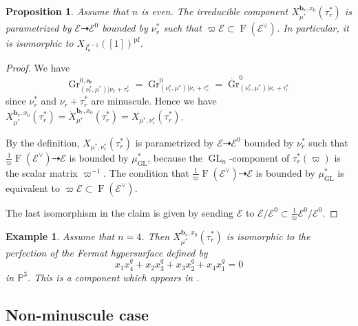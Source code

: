 \documentclass[12pt,a4paper]{article}
\newtheorem{prop}[thm]{Proposition}
\newtheorem{eg}[thm]{Example}
\DeclareMathOperator{\Gr}{Gr}
\DeclareMathOperator{\GL}{GL}
\DeclareMathOperator{\oF}{F}
\newcommand{\bP}{\mathbb{P}}
\newcommand{\bfa}{\mathbf{a}}
\newcommand{\bfb}{\mathbf{b}}
\newcommand{\cE}{\mathcal{E}}
\begin{document}
\begin{prop}\label{prop:nur}
Assume that $n$ is even. The irreducible component 
$X_{\mu^*}^{\bfb_r,x_0}(\tau_r^*)$ is 
parametrized by 
$\cE \dashrightarrow \cE^0$ bounded by 
$\nu_r^*$ such that 
$\varpi \cE \subset \oF (\cE^{\vee})$. 
In particular, it is isomorphic to 
$X_{I_{n}^{r-1}}([1])^{\mathrm{pf}}$. 
\end{prop}
\begin{proof}
We have 
\[
 \Gr^{0,\bfa_r}_{(\nu^*_r, \mu^*) | \nu_r+\tau^*_r }
 =\Gr^{0}_{(\nu^*_r, \mu^*) | \nu_r+\tau^*_r }
 =\mathring{\Gr}^{0}_{(\nu^*_r, \mu^*) | \nu_r+\tau^*_r } 
\] 
since $\nu_r^*$ and $\nu_r+\tau^*_r$ are minuscule. Hence we have 
$X_{\mu^*}^{\bfb_r,x_0}(\tau_r^*)=\mathring{X}_{\mu^*}^{\bfb_r,x_0}(\tau_r^*)=X_{\mu^*,\nu_r^*}(\tau_r^*)$. 

By the definition, 
$X_{\mu^*,\nu_r^*}(\tau_r^*)$ 
is parametrized by 
$\cE \dashrightarrow \cE^0$ bounded by 
$\nu_r^*$ such that 
$\frac{1}{\varpi} \oF (\cE^{\vee}) \dashrightarrow \cE$ 
is bounded by $\mu_{\GL}^*$, because the $\GL_n$-component of $\tau_r^*(\varpi)$ is the scalar matrix $\varpi^{-1}$. 
The condition that 
$\frac{1}{\varpi} \oF (\cE^{\vee}) \dashrightarrow \cE$ 
is bounded by $\mu_{\GL}^*$ is equivalent to 
$\varpi \cE \subset \oF (\cE^{\vee})$. 

The last isomorphism in the claim 
is given by sending 
$\cE$ to 
$\cE/\cE^0 \subset \frac{1}{\varpi} \cE^0/\cE^0$. 
\end{proof}

\begin{eg}
Assume that $n=4$. Then 
$X_{\mu^*}^{\bfb_r,x_0}(\tau_r^*)$ is isomorphic to 
the perfection of the Fermat hypersurface 
defined by 
\[
 x_1 x_4^q + x_2 x_3^q + x_3 x_2^q +x_4 x_1^q =0 
\]
in $\bP^3$. 
This is a component which appears in \cite[p.1689]{HoPaGU22}. 
\end{eg}

\subsection{Non-minuscule case}\label{sebsec:nonmin}
\end{document}
